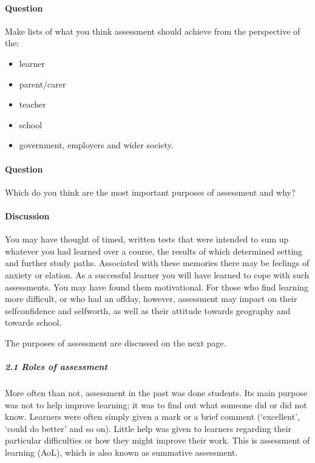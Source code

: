 \documentclass[letterpaper,10pt,english]{sphinxmanual}
\begin{document}
\paragraph{Question}
\label{\detokenize{content/session_00/Part_00_02:question-1}}\label{\detokenize{content/session_00/Part_00_02:id1}}
Make lists of what you think assessment should achieve from the perspective of the:
\begin{itemize}
\item {} 
learner

\item {} 
parent/carer

\item {} 
teacher

\item {} 
school

\item {} 
government, employers and wider society.

\end{itemize}


\paragraph{Question}
\label{\detokenize{content/session_00/Part_00_02:question-2}}\label{\detokenize{content/session_00/Part_00_02:id2}}
Which do you think are the most important purposes of assessment and why?


\paragraph{Discussion}
\label{\detokenize{content/session_00/Part_00_02:Discussion}}
You may have thought of timed, written tests that were intended to sum up whatever you had learned over a course, the results of which determined setting and further study paths. Associated with these memories there may be feelings of anxiety or elation. As a successful learner you will have learned to cope with such assessments. You may have found them motivational. For those who find learning more difficult, or who had an off\sphinxhyphen{}day, however, assessment may impact on their self\sphinxhyphen{}confidence and
self\sphinxhyphen{}worth, as well as their attitude towards geography and towards school.

The purposes of assessment are discussed on the next page.


\subparagraph{2.1 Roles of assessment}
\label{\detokenize{content/session_00/Part_00_02:2.1-Roles-of-assessment}}
More often than not, assessment in the past was done  students. Its main purpose was not to help improve learning; it was to find out what someone did \textendash{} or did not \textendash{} know. Learners were often simply given a mark or a brief comment (‘excellent’, ‘could do better’ and so on). Little help was given to learners regarding their particular difficulties or how they might improve their work. This is assessment of learning (AoL), which is also known as summative assessment.
\end{document}
